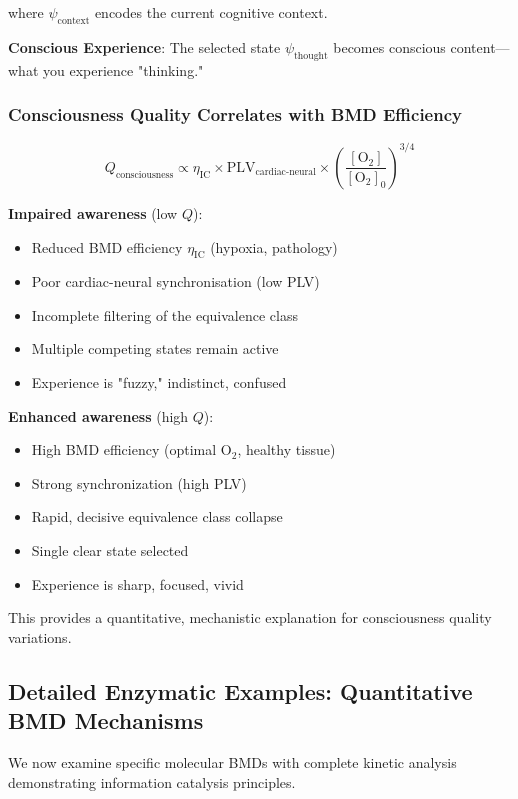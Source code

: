\documentclass[11pt,onecolumn]{article}
\begin{document}
where $\psi_{\text{context}}$ encodes the current cognitive context.

\textbf{Conscious Experience}: The selected state $\psi_{\text{thought}}$ becomes conscious content---what you experience "thinking."

\subsubsection{Consciousness Quality Correlates with BMD Efficiency}

\begin{equation}
Q_{\text{consciousness}} \propto \eta_{\text{IC}} \times \text{PLV}_{\text{cardiac-neural}} \times \left(\frac{[\text{O}_2]}{[\text{O}_2]_0}\right)^{3/4}
\end{equation}

\textbf{Impaired awareness} (low $Q$):
\begin{itemize}
    \item Reduced BMD efficiency $\eta_{\text{IC}}$ (hypoxia, pathology)
    \item Poor cardiac-neural synchronisation (low PLV)
    \item Incomplete filtering of the equivalence class
    \item Multiple competing states remain active
    \item Experience is "fuzzy," indistinct, confused
\end{itemize}

\textbf{Enhanced awareness} (high $Q$):
\begin{itemize}
    \item High BMD efficiency (optimal O$_2$, healthy tissue)
    \item Strong synchronization (high PLV)
    \item Rapid, decisive equivalence class collapse
    \item Single clear state selected
    \item Experience is sharp, focused, vivid
\end{itemize}

This provides a quantitative, mechanistic explanation for consciousness quality variations.

\subsection{Detailed Enzymatic Examples: Quantitative BMD Mechanisms}

We now examine specific molecular BMDs with complete kinetic analysis demonstrating information catalysis principles.
\end{document}
